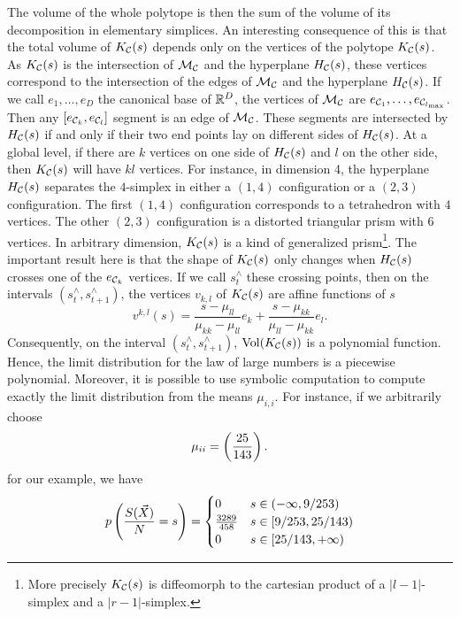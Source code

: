 \documentclass{article}
\begin{document}
The volume of the whole polytope is then the sum of the volume of its decomposition in elementary simplices.
An interesting consequence of this is that the total volume of $K_\mathcal C (s)$ depends only on the vertices of the polytope 
$K_\mathcal C (s)$. As $K_\mathcal C (s)$ is the intersection of $\mathcal M_{\mathcal C }$ and the hyperplane $H_\mathcal C (s)$, these vertices correspond 
to the intersection of the edges of $\mathcal M_{\mathcal C }$ and the hyperplane $H_\mathcal C (s)$. If we call $e_1,\dots,e_{D}$ the canonical
base of $\mathbb R^D$, the vertices of $\mathcal M_{\mathcal C }$ are $e_{\mathcal C _1},\dots, e_{\mathcal C _{{l_{\max}}}}$. Then any $[e_{\mathcal C _k}, e_{\mathcal C _l}]$ segment is an edge of $\mathcal M_{\mathcal C }$.
These segments are intersected by $H_\mathcal C (s)$ if and only if their two end points lay on different sides of $H_\mathcal C (s)$.
At a global level, if there are $k$ vertices on one side of $H_\mathcal C (s)$ and $l$ on the other side, then $K_\mathcal C (s)$ will
have $kl$ vertices. For instance, in dimension 4, the hyperplane $H_\mathcal C (s)$ separates the $4$-simplex in either a $(1,4)$ 
configuration or a $(2,3)$ configuration. The first $(1,4)$ configuration corresponds to a tetrahedron with $4$ vertices.
The other $(2,3)$ configuration is a distorted triangular prism with $6$ vertices. In arbitrary dimension,
$K_\mathcal C (s)$ is a kind of generalized prism\footnote{More precisely $K_\mathcal C (s)$ is diffeomorph 
to the cartesian product of a $|l-1|$-simplex and a $|r-1|$-simplex.}. 
The important result here is that the shape of $K_\mathcal C (s)$ only changes when $H_\mathcal C (s)$ crosses one of the $e_{\mathcal C _k}$ vertices.
If we call $s^{\wedge}_t$ these crossing points, then on the intervals $(s^{\wedge}_t,s^{\wedge}_{t+1})$, the vertices $v_{k,l}$ of
$K_\mathcal C (s)$ are affine functions of $s$ 
\begin{equation}
v^{k,l}(s) =  \frac{ s -  \mu _{ll} }{ \mu_{kk} - \mu _{ll} }  e_k + \frac{ s - \mu _{kk} }{ \mu _{ll} - \mu _{kk} }  e_l. 
\end{equation} 
Consequently, on the interval $(s^{\wedge}_t,s^{\wedge}_{t+1})$, $\mathrm{Vol}(K_\mathcal C (s))$ is a polynomial function.
Hence, the limit distribution for the law of large numbers is a piecewise polynomial.
Moreover, it is possible to use symbolic computation to compute exactly the limit distribution from the means $\mu_{i,i}$. For instance, if we arbitrarily choose 
\begin{equation}
\mu_{ii} = \left(\frac{25}{143}\right).
\end{equation}
for our example, we have
%
\begin{equation}
 p \left( \frac{S(\vec{X})}{N} = s \right) = \begin{cases}
 0 & s \in (-\infty,9/253)\\
\frac{3289}{458} & s \in [9/253,25/143)\\
 0 & s \in [25/143, +\infty )
 \end{cases} 
\end{equation}
%
\end{document}

